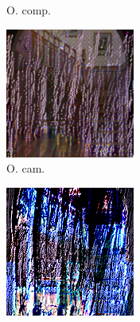 \begin{figure}[]
\begin{subfigure}{\textwidth}
\begin{subfigure}{0.19\textwidth}
            \caption{O. comp.}
            \label{fig:ex03-staircase_illum-wood-stats_im}
        \end{subfigure}
        \hfill
        \begin{subfigure}{0.19\textwidth}
            \centering
            \includegraphics[width=\textwidth]{images/04-experiment03/staircase_illum/wood/stats_proj.jpg}
            \caption{O. cam.}
            \label{fig:ex03-staircase_illum-wood-stats_proj}
        \end{subfigure}
        \hfill
        \begin{subfigure}{0.19\textwidth}
            \centering
            \includegraphics[width=\textwidth]{images/04-experiment03/staircase_illum/wood/pixel_im.jpg}

\end{subfigure}
\end{subfigure}
\end{figure}
